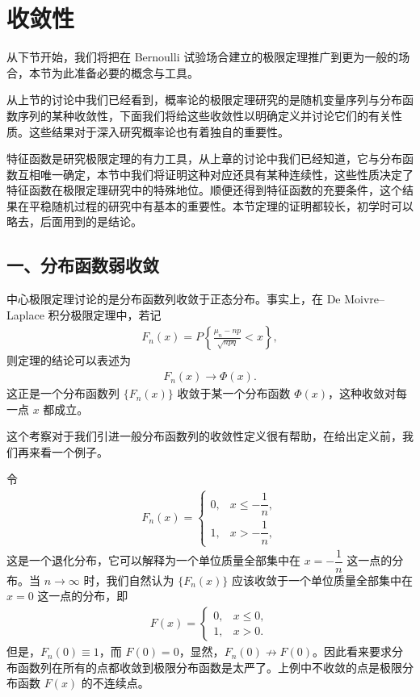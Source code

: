 \documentclass[../../main.tex]{subfiles}
\begin{document}
\section{收敛性}\label{section:ch05-收敛性}

从下节开始，我们将把在 Bernoulli 试验场合建立的极限定理推广到更为一般的场合，本节为此准备必要的概念与工具。

从上节的讨论中我们已经看到，概率论的极限定理研究的是随机变量序列与分布函数序列的某种收敛性，下面我们将给这些收敛性以明确定义并讨论它们的有关性质。这些结果对于深入研究概率论也有着独自的重要性。

特征函数是研究极限定理的有力工具，从上章的讨论中我们已经知道，它与分布函数互相唯一确定，本节中我们将证明这种对应还具有某种连续性，这些性质决定了特征函数在极限定理研究中的特殊地位。顺便还得到特征函数的充要条件，这个结果在平稳随机过程的研究中有基本的重要性。本节定理的证明都较长，初学时可以略去，后面用到的是结论。

\subsection*{一、分布函数弱收敛}

中心极限定理讨论的是分布函数列收敛于正态分布。事实上，在 De Moivre--Laplace 积分极限定理中，若记
\begin{align*}
F_n(x)=P\!\left\{\frac{\mu_n-np}{\sqrt{npq}}<x\right\},
\end{align*}
则定理的结论可以表述为
\begin{align*}
F_n(x)\to\Phi(x).
\end{align*}
这正是一个分布函数列 $\{F_n(x)\}$ 收敛于某一个分布函数 $\Phi(x)$，这种收敛对每一点 $x$ 都成立。

这个考察对于我们引进一般分布函数列的收敛性定义很有帮助，在给出定义前，我们再来看一个例子。

\begin{example}\label{example:ch05-退化分布逼近1}
令
\begin{align}
F_n(x)=
\begin{cases}
0,&x\leqslant-\dfrac1n,\\
1,&x>-\dfrac1n,
\end{cases}
\end{align}
这是一个退化分布，它可以解释为一个单位质量全部集中在 $x=-\dfrac1n$ 这一点的分布。当 $n\to\infty$ 时，我们自然认为 $\{F_n(x)\}$ 应该收敛于一个单位质量全部集中在 $x=0$ 这一点的分布，即
\begin{align*}
F(x)=
\begin{cases}
0,&x\leqslant0,\\
1,&x>0.
\end{cases}
\end{align*}
但是，$F_n(0)\equiv1$，而 $F(0)=0$，显然，$F_n(0)\not\to F(0)$。因此看来要求分布函数列在所有的点都收敛到极限分布函数是太严了。上例中不收敛的点是极限分布函数 $F(x)$ 的不连续点。
\end{example}
\end{document}
